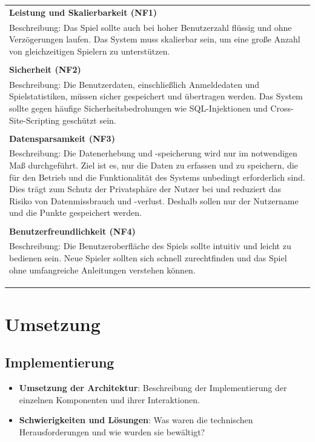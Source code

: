 \documentclass[
]{article}
\begin{document}
\begin{center}
  \begin{tabular}{|p{\linewidth}|}
    \hline
    \textbf{Leistung und Skalierbarkeit (NF1)} \\
    Beschreibung: Das Spiel sollte auch bei hoher Benutzerzahl flüssig und ohne Verzögerungen laufen. Das System muss skalierbar sein, um eine große Anzahl von gleichzeitigen Spielern zu unterstützen. \\ \\
    \hline
    \textbf{Sicherheit (NF2)} \\
    Beschreibung: Die Benutzerdaten, einschließlich Anmeldedaten und Spielstatistiken, müssen sicher gespeichert und übertragen werden. Das System sollte gegen häufige Sicherheitsbedrohungen wie SQL-Injektionen und Cross-Site-Scripting geschützt sein.\\ \\
    \hline
    \textbf{Datensparsamkeit (NF3)} \\
     Beschreibung:
     Die Datenerhebung und -speicherung wird nur im notwendigen Maß durchgeführt. 
     Ziel ist es, nur die Daten zu erfassen und zu speichern, die für den Betrieb und die Funktionalität des Systems unbedingt erforderlich sind. 
     Dies trägt zum Schutz der Privatsphäre der Nutzer bei und reduziert das Risiko von Datenmissbrauch und -verlust.
     Deshalb sollen nur der Nutzername und die Punkte gespeichert werden.
    \\ \\
    \hline
    \textbf{Benutzerfreundlichkeit (NF4)} \\
    Beschreibung: Die Benutzeroberfläche des Spiels sollte intuitiv und leicht zu bedienen sein. Neue Spieler sollten sich schnell zurechtfinden und das Spiel ohne umfangreiche Anleitungen verstehen können.\\ \\
    \\ \\
    \hline
  \end{tabular}
\end{center}

\section{Umsetzung}

\subsection{Implementierung}
\begin{itemize}
    \item \textbf{Umsetzung der Architektur}: Beschreibung der Implementierung der einzelnen Komponenten und ihrer Interaktionen.
    \item \textbf{Schwierigkeiten und Lösungen}: Was waren die technischen Herausforderungen und wie wurden sie bewältigt?
\end{itemize}
\end{document}
